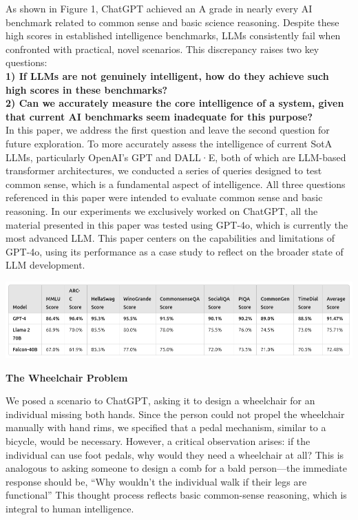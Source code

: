 \documentclass[11pt]{scrartcl}
\begin{document}
As shown in Figure 1, ChatGPT achieved an A grade in nearly every AI benchmark related to common sense and basic science reasoning. Despite these high scores in established intelligence benchmarks, LLMs consistently fail when confronted with practical, novel scenarios. This discrepancy raises two key questions: \\
\textbf{1) If LLMs are not genuinely intelligent, how do they achieve such high scores in these benchmarks?} \\
\textbf{ 2) Can we accurately measure the core intelligence of a system, given that current AI benchmarks seem inadequate for this purpose?} \\
In this paper, we address the first question and leave the second question for future exploration.
To more accurately assess the intelligence of current SotA LLMs, particularly OpenAI's GPT and DALL·E, both of which are LLM-based transformer architectures, we conducted a series of queries designed to test common sense, which is a fundamental aspect of intelligence. All three questions referenced in this paper were intended to evaluate common sense and basic reasoning. In our experiments we exclusively worked on ChatGPT, all the material presented in this paper was tested using GPT-4o, which is currently the most advanced LLM. This paper centers on the capabilities and limitations of GPT-4o, using its performance as a case study to reflect on the broader state of LLM development. \\

\begin{center}
\includegraphics[scale=0.39]{AI_scores.png}
\end{center}

\begin{huge}
\textbf{The Wheelchair Problem}
\end{huge}
We posed a scenario to ChatGPT, asking it to design a wheelchair for an individual missing both hands. Since the person could not propel the wheelchair manually with hand rims, we specified that a pedal mechanism, similar to a bicycle, would be necessary. However, a critical observation arises: if the individual can use foot pedals, why would they need a wheelchair at all? This is analogous to asking someone to design a comb for a bald person—the immediate response should be, “Why wouldn’t the individual walk if their legs are functional” This thought process reflects basic common-sense reasoning, which is integral to human intelligence.
\end{document}
